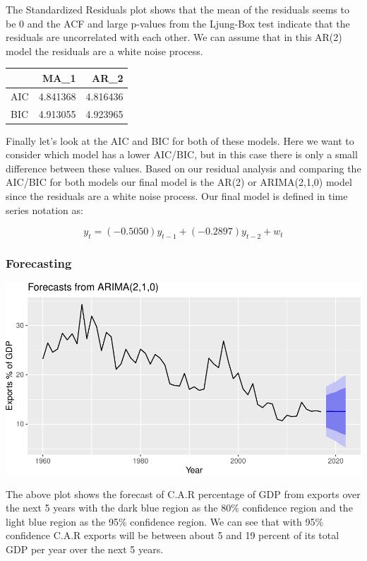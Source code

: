 \documentclass[
]{article}
\begin{document}
The Standardized Residuals plot shows that the mean of the residuals
seems to be 0 and the ACF and large p-values from the Ljung-Box test
indicate that the residuals are uncorrelated with each other. We can
assume that in this AR(2) model the residuals are a white noise process.

\begin{center}


\begin{tabular}{l|r|r}
\hline
  & MA\_1 & AR\_2\\
\hline
AIC & 4.841368 & 4.816436\\
\hline
BIC & 4.913055 & 4.923965\\
\hline
\end{tabular}

\end{center}

Finally let's look at the AIC and BIC for both of these models. Here we
want to consider which model has a lower AIC/BIC, but in this case there
is only a small difference between these values. Based on our residual
analysis and comparing the AIC/BIC for both models our final model is
the AR(2) or ARIMA(2,1,0) model since the residuals are a white noise
process. Our final model is defined in time series notation as:

\[y_t = (-0.5050) y_{t-1} + (-0.2897) y_{t-2} + w_t\]

\hypertarget{forecasting}{%
\subsubsection{Forecasting}\label{forecasting}}

\includegraphics{STA_137_Final_Project_files/figure-latex/unnamed-chunk-12-1.pdf}

The above plot shows the forecast of C.A.R percentage of GDP from
exports over the next 5 years with the dark blue region as the 80\%
confidence region and the light blue region as the 95\% confidence
region. We can see that with 95\% confidence C.A.R exports will be
between about 5 and 19 percent of its total GDP per year over the next 5
years.
\end{document}
